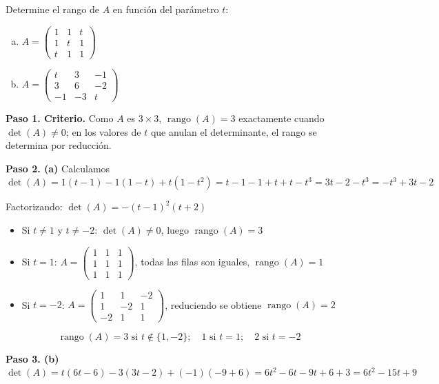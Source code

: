 \begin{prob} Determine el rango de $A$ en función del parámetro $t$:
\begin{enumerate}[(a)]
\item $A = \begin{pmatrix} 1 & 1 & t \\ 1 & t & 1 \\ t & 1 & 1 \end{pmatrix}$
\item $A = \begin{pmatrix} t & 3 & -1 \\ 3 & 6 & -2 \\ -1 & -3 & t \end{pmatrix}$
\end{enumerate}

\begin{myproof}
\textbf{Paso 1. Criterio.} Como $A$ es $3\times 3$, $\operatorname{rango}(A)=3$ exactamente cuando $\det(A)\neq 0$; en los valores de $t$ que anulan el determinante, el rango se determina por reducción.

\textbf{Paso 2. (a)} Calculamos $\det(A) = 1(t-1) - 1(1-t) + t(1-t^2) = t-1-1+t+t-t^3 = 3t-2-t^3 = -t^3+3t-2$

Factorizando: $\det(A) = -(t-1)^2(t+2)$

\begin{itemize}
    \item Si $t \neq 1$ y $t \neq -2$: $\det(A) \neq 0$, luego $\operatorname{rango}(A) = 3$
    \item Si $t = 1$: $A = \begin{pmatrix} 1 & 1 & 1 \\ 1 & 1 & 1 \\ 1 & 1 & 1 \end{pmatrix}$, todas las filas son iguales, $\operatorname{rango}(A) = 1$
    \item Si $t = -2$: $A = \begin{pmatrix} 1 & 1 & -2 \\ 1 & -2 & 1 \\ -2 & 1 & 1 \end{pmatrix}$, reduciendo se obtiene $\operatorname{rango}(A) = 2$
\end{itemize}
$$\boxed{\operatorname{rango}(A) = 3 \text{ si } t \notin \{1,-2\};\quad 1 \text{ si } t = 1;\quad 2 \text{ si } t = -2}$$

\textbf{Paso 3. (b)} $\det(A) = t(6t-6) - 3(3t-2) + (-1)(-9+6) = 6t^2-6t-9t+6+3 = 6t^2-15t+9$


\end{myproof}
\end{prob}
